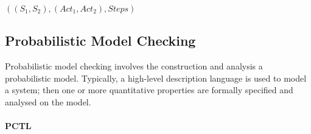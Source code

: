 \documentclass{llncs}
\newcommand{\comment}[1]{{\color{red}{[\sf #1]}}}
\begin{document}
$((S_1,S_2),(Act_1,Act_2),Steps)$
\comment{do we partition states or actions?}

\subsection{Probabilistic Model Checking}

\comment{hi-level descr. already (now) in intro; focus on property spec and point to model checking algorithms here...}

Probabilistic model checking involves the construction and analysis a probabilistic model.
Typically, a high-level description language is used to model a system;
then one or more quantitative properties are formally specified and analysed on the model.

\paragraph{PCTL}


\end{document}
